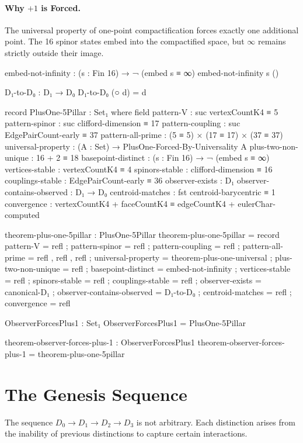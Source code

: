 \documentclass[11pt,a4paper]{book}
\begin{document}
\paragraph{Why $+1$ is Forced.}
The universal property of one-point compactification forces exactly one additional 
point. The 16 spinor states embed into the compactified space, but $\infty$ remains 
strictly outside their image.

\begin{code}
embed-not-infinity : (s : Fin 16) → ¬ (embed s ≡ ∞)
embed-not-infinity s ()

D₁-to-D₀ : D₁ → D₀
D₁-to-D₀ (○ d) = d

record PlusOne-5Pillar : Set₁ where
  field
    pattern-V : suc vertexCountK4 ≡ 5
    pattern-spinor : suc clifford-dimension ≡ 17
    pattern-coupling : suc EdgePairCount-early ≡ 37
    pattern-all-prime : (5 ≡ 5) × (17 ≡ 17) × (37 ≡ 37)
    universal-property : (A : Set) → PlusOne-Forced-By-Universality A
    plus-two-non-unique : 16 + 2 ≡ 18
    basepoint-distinct : (s : Fin 16) → ¬ (embed s ≡ ∞)
    vertices-stable : vertexCountK4 ≡ 4
    spinors-stable : clifford-dimension ≡ 16
    couplings-stable : EdgePairCount-early ≡ 36
    observer-exists : D₁
    observer-contains-observed : D₁ → D₀
    centroid-matches : fst centroid-barycentric ≡ 1
    convergence : vertexCountK4 + faceCountK4 ≡ edgeCountK4 + eulerChar-computed

theorem-plus-one-5pillar : PlusOne-5Pillar
theorem-plus-one-5pillar = record
  { pattern-V = refl
  ; pattern-spinor = refl
  ; pattern-coupling = refl
  ; pattern-all-prime = refl , refl , refl
  ; universal-property = theorem-plus-one-universal
  ; plus-two-non-unique = refl
  ; basepoint-distinct = embed-not-infinity
  ; vertices-stable = refl
  ; spinors-stable = refl
  ; couplings-stable = refl
  ; observer-exists = canonical-D₁
  ; observer-contains-observed = D₁-to-D₀
  ; centroid-matches = refl
  ; convergence = refl
  }

ObserverForcesPlus1 : Set₁
ObserverForcesPlus1 = PlusOne-5Pillar

theorem-observer-forces-plus-1 : ObserverForcesPlus1
theorem-observer-forces-plus-1 = theorem-plus-one-5pillar
\end{code}

\section{The Genesis Sequence}

The sequence $D_0 \to D_1 \to D_2 \to D_3$ is not arbitrary. Each distinction arises from the inability of previous distinctions to capture certain interactions.
\end{document}
